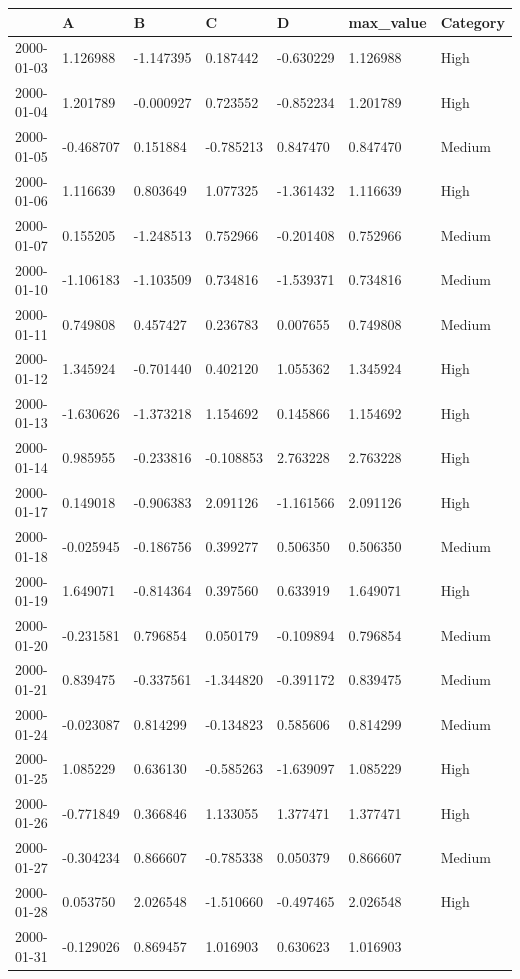 \documentclass[
  letterpaper,
  DIV=11,
  numbers=noendperiod]{scrartcl}
\begin{document}
\begin{longtable}[]{@{}lllllll@{}}
\toprule()
& A & B & C & D & max\_value & Category \\
\midrule()
\endhead
2000-01-03 & 1.126988 & -1.147395 & 0.187442 & -0.630229 & 1.126988 &
High \\
2000-01-04 & 1.201789 & -0.000927 & 0.723552 & -0.852234 & 1.201789 &
High \\
2000-01-05 & -0.468707 & 0.151884 & -0.785213 & 0.847470 & 0.847470 &
Medium \\
2000-01-06 & 1.116639 & 0.803649 & 1.077325 & -1.361432 & 1.116639 &
High \\
2000-01-07 & 0.155205 & -1.248513 & 0.752966 & -0.201408 & 0.752966 &
Medium \\
2000-01-10 & -1.106183 & -1.103509 & 0.734816 & -1.539371 & 0.734816 &
Medium \\
2000-01-11 & 0.749808 & 0.457427 & 0.236783 & 0.007655 & 0.749808 &
Medium \\
2000-01-12 & 1.345924 & -0.701440 & 0.402120 & 1.055362 & 1.345924 &
High \\
2000-01-13 & -1.630626 & -1.373218 & 1.154692 & 0.145866 & 1.154692 &
High \\
2000-01-14 & 0.985955 & -0.233816 & -0.108853 & 2.763228 & 2.763228 &
High \\
2000-01-17 & 0.149018 & -0.906383 & 2.091126 & -1.161566 & 2.091126 &
High \\
2000-01-18 & -0.025945 & -0.186756 & 0.399277 & 0.506350 & 0.506350 &
Medium \\
2000-01-19 & 1.649071 & -0.814364 & 0.397560 & 0.633919 & 1.649071 &
High \\
2000-01-20 & -0.231581 & 0.796854 & 0.050179 & -0.109894 & 0.796854 &
Medium \\
2000-01-21 & 0.839475 & -0.337561 & -1.344820 & -0.391172 & 0.839475 &
Medium \\
2000-01-24 & -0.023087 & 0.814299 & -0.134823 & 0.585606 & 0.814299 &
Medium \\
2000-01-25 & 1.085229 & 0.636130 & -0.585263 & -1.639097 & 1.085229 &
High \\
2000-01-26 & -0.771849 & 0.366846 & 1.133055 & 1.377471 & 1.377471 &
High \\
2000-01-27 & -0.304234 & 0.866607 & -0.785338 & 0.050379 & 0.866607 &
Medium \\
2000-01-28 & 0.053750 & 2.026548 & -1.510660 & -0.497465 & 2.026548 &
High \\
2000-01-31 & -0.129026 & 0.869457 & 1.016903 & 0.630623 & 1.016903 &

\end{longtable}
\end{document}
